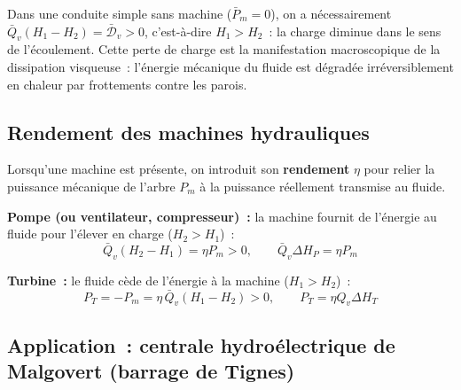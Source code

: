 \documentclass[11pt,a4paper]{report}
\begin{document}
Dans une conduite simple sans machine ($\bar{P}_m=0$), on a nécessairement
$\bar{Q}_v(H_1-H_2) = \bar{\mathcal{D}}_v > 0$, c'est-à-dire $H_1>H_2$~:
la charge diminue dans le sens de l'écoulement. Cette perte de charge est
la manifestation macroscopique de la dissipation visqueuse~: l'énergie mécanique du
fluide est dégradée irréversiblement en chaleur par frottements contre les parois.

\subsection{Rendement des machines hydrauliques}

Lorsqu'une machine est présente, on introduit son \textbf{rendement} $\eta$
pour relier la puissance mécanique de l'arbre $P_m$ à la puissance réellement
transmise au fluide.

\medskip
\textbf{Pompe (ou ventilateur, compresseur)~:} la machine fournit de l'énergie au
fluide pour l'élever en charge ($H_2>H_1$)~:
\[
    \bar{Q}_v(H_2-H_1) = \eta P_m > 0, \qquad \bar{Q}_v\Delta H_P = \eta P_m
\]

\textbf{Turbine~:} le fluide cède de l'énergie à la machine ($H_1>H_2$)~:
\[
    P_T = -P_m = \eta\,\bar{Q}_v(H_1-H_2) > 0, \qquad P_T = \eta Q_v\Delta H_T
\]

\subsection{Application~: centrale hydroélectrique de Malgovert (barrage de Tignes)}

\begin{center}
\end{center}
\end{document}

